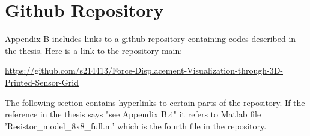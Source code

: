 \chapter{Github Repository}
Appendix B includes links to a github repository containing codes described in the thesis. Here is a link to the repository main:


\url{https://github.com/s214413/Force-Displacement-Visualization-through-3D-Printed-Sensor-Grid}

The following section contains hyperlinks to certain parts of the repository. If the reference in the thesis says "see Appendix B.4" it refers to Matlab file 'Resistor\_model\_8x8\_full.m' which is the fourth file in the repository.


